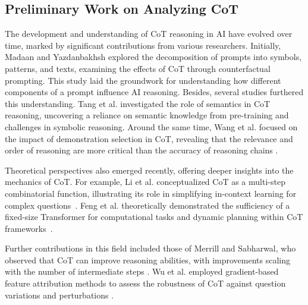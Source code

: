 \documentclass[11pt]{article}
\begin{document}



\subsection{Preliminary Work on Analyzing CoT}
The development and understanding of CoT reasoning in AI have evolved over time, marked by significant contributions from various researchers. Initially, Madaan and Yazdanbakhsh \cite{madaan2022text} explored the decomposition of prompts into symbols, patterns, and texts, examining the effects of CoT through counterfactual prompting. This study laid the groundwork for understanding how different components of a prompt influence AI reasoning.
Besides, several studies furthered this understanding. Tang et al. \cite{tang2023large} investigated the role of semantics in CoT reasoning, uncovering a reliance on semantic knowledge from pre-training and challenges in symbolic reasoning. Around the same time, Wang et al. focused on the impact of demonstration selection in CoT, revealing that the relevance and order of reasoning are more critical than the accuracy of reasoning chains \cite{wang2023selfconsistency}.

Theoretical perspectives also emerged recently, offering deeper insights into the mechanics of CoT. For example, Li et al. conceptualized CoT as a multi-step combinatorial function, illustrating its role in simplifying in-context learning for complex questions~\cite{li2023dissecting}. Feng et al. theoretically demonstrated the sufficiency of a fixed-size Transformer for computational tasks and dynamic planning within CoT frameworks~\cite{fu2023complexitybased}.

Further contributions in this field included those of Merrill and Sabharwal, who observed that CoT can improve reasoning abilities, with improvements scaling with the number of intermediate steps \cite{merrill2023expressive}. Wu et al. employed gradient-based feature attribution methods to assess the robustness of CoT against question variations and perturbations \cite{wu2023analyzing}.
\end{document}
